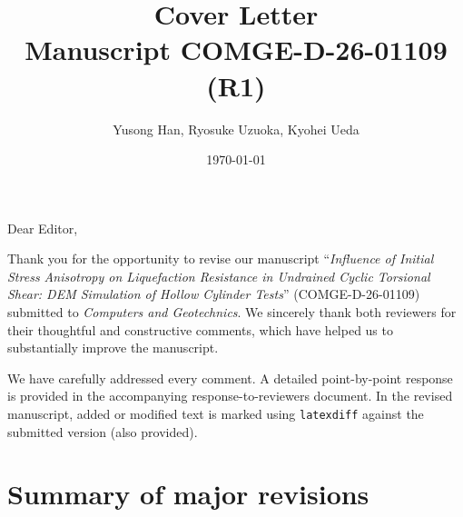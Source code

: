 \documentclass[11pt,a4paper]{article}
\title{Cover Letter\\
  \large Manuscript COMGE-D-26-01109 (R1)}
\author{Yusong Han, Ryosuke Uzuoka, Kyohei Ueda}
\date{\today}
\begin{document}
\maketitle

Dear Editor,

Thank you for the opportunity to revise our manuscript
``\emph{Influence of Initial Stress Anisotropy on Liquefaction Resistance
in Undrained Cyclic Torsional Shear: DEM Simulation of Hollow Cylinder
Tests}'' (COMGE-D-26-01109) submitted to
\emph{Computers and Geotechnics}. We sincerely thank both reviewers for their
thoughtful and constructive comments, which have helped us to substantially
improve the manuscript.

We have carefully addressed every comment. A detailed point-by-point response
is provided in the accompanying response-to-reviewers document. In the revised
manuscript, added or modified text is marked using \texttt{latexdiff} against
the submitted version (also provided).

\section*{Summary of major revisions}
\end{document}

